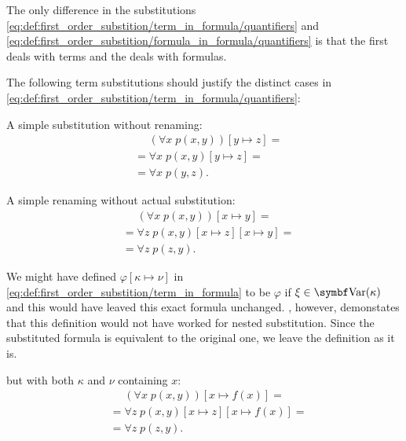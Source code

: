 \begin{definition}
\begin{DefEnum}
    The only difference in the substitutions \eqref{eq:def:first_order_substition/term_in_formula/quantifiers} and \eqref{eq:def:first_order_substition/formula_in_formula/quantifiers} is that the first deals with terms and the deals with formulas.
  \end{DefEnum}
\end{definition}

\begin{example}\label{ex:first_order_substition}
  The following term substitutions should justify the distinct cases in \eqref{eq:def:first_order_substition/term_in_formula/quantifiers}:
  \begin{ExEnum}
     A simple substitution without renaming:
    \begin{align*}
      &\phantom{{}={}}
      (\forall x\; p(x, y))[y \mapsto z]
      = \\ &=
      \forall x\; p(x, y)[y \mapsto z]
      = \\ &=
      \forall x\; p(y, z).
    \end{align*}

     A simple renaming without actual substitution:
    \begin{align*}
      &\phantom{{}={}}
      (\forall x\; p(x, y))[x \mapsto y]
      = \\ &=
      \forall z\; p(x, y)[x \mapsto z][x \mapsto y]
      = \\ &=
      \forall z\; p(z, y).
    \end{align*}

    We might have defined \( \varphi[\kappa \mapsto \nu] \) in \eqref{eq:def:first_order_substition/term_in_formula} to be \( \varphi \) if \( \xi \in \Bold{Var}(\kappa) \) and this would have leaved this exact formula unchanged. , however, demonstates that this definition would not have worked for nested substitution. Since the substituted formula is equivalent to the original one, we leave the definition as it is.

      but with both \( \kappa \) and \( \nu \) containing \( x \):
    \begin{align*}
      &\phantom{{}={}}
      (\forall x\; p(x, y))[x \mapsto f(x)]
      = \\ &=
      \forall z\; p(x, y)[x \mapsto z][x \mapsto f(x)]
      = \\ &=
      \forall z\; p(z, y).
    \end{align*}


\end{ExEnum}
\end{example}
